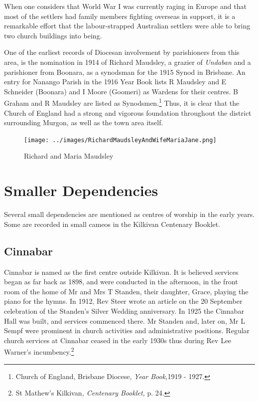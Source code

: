 When one considers that World War I was currently raging in Europe and that most of the settlers had family members fighting overseas in support, it is a remarkable effort that the labour-strapped Australian settlers were able to bring two church buildings into being.



One of the earliest records of Diocesan involvement by parishioners from this area, is the nomination in 1914 of Richard Maudsley, a grazier of \emph{Undaban} and a parishioner from Boonara, as a synodsman for the 1915 Synod in Brisbane. An entry for Nanango Parish in the 1916 Year Book lists R Maudsley and E Schneider (Boonara) and I Moore (Goomeri) as Wardens for their centres. B Graham and R Maudsley are listed as Synodsmen.\footnote{Church of England, Brisbane Diocese, \emph{Year Book,}1919 - 1927.} Thus, it is clear that the Church of England had a strong and vigorous foundation throughout the district surrounding Murgon, as well as the town area itself.








\begin{figure}
\begin{center}
\texttt{[image: ../images/RichardMaudsleyAndWifeMariaJane.png]}
\caption{Richard and Maria Maudsley}
\end{center}
\end{figure}




\section{Smaller Dependencies}



Several small dependencies are mentioned as centres of worship in the early years. Some are recorded in small cameos in the Kilkivan Centenary Booklet.



\subsection{Cinnabar}



Cinnabar is named as the first centre outside Kilkivan. It is believed services began as far back as 1898, and were conducted in the afternoon, in the front room of the home of Mr and Mrs T Standen, their daughter, Grace, playing the piano for the hymns. In 1912, Rev Steer wrote an article on the 20 September celebration of the Standen's Silver Wedding anniversary. In 1925 the Cinnabar Hall was built, and services commenced there. Mr Standen and, later on, Mr L Sempf were prominent in church activities and administrative positions. Regular church services at Cinnabar ceased in the early 1930s thus during Rev Lee Warner's incumbency.\footnote{St Mathew's Kilkivan\emph{, Centenary Booklet,} p. 24.}


